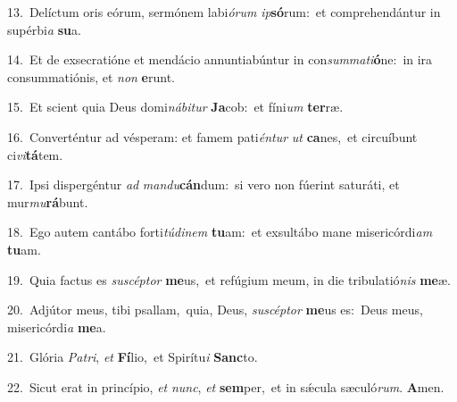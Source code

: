 {\numbfont\textcolor{\numbcolor}{13.}}~Delíctum oris eórum, sermónem labi\-\textit{ó}\-\textit{rum} \textit{ip}\-\textbf{só}rum:~\star et comprehendántur in supérbi\textit{a} \textbf{su}\-a.\par
{\numbfont\textcolor{\numbcolor}{14.}}~Et de exsecratióne et mendácio annuntiabúntur in con\-\textit{sum}\-\textit{ma}\textit{ti}\textbf{ó}ne:~\star in ira consummatiónis, et \textit{non} \textbf{e}\-runt.\par
{\numbfont\textcolor{\numbcolor}{15.}}~Et scient quia Deus domi\-\textit{ná}\-\textit{bi}\textit{tur} \textbf{Ja}\-cob:~\star et fíni\textit{um} \textbf{ter}\-ræ.\par
{\numbfont\textcolor{\numbcolor}{16.}}~Converténtur ad vésperam: et famem pati\-\textit{én}\-\textit{tur} \textit{ut} \textbf{ca}\-nes,~\star et circuíbunt ci\-\textit{vi}\-\textbf{tá}tem.\par
{\numbfont\textcolor{\numbcolor}{17.}}~Ipsi dispergéntur \textit{ad} \textit{man}\-\textit{du}\textbf{cán}dum:~\star si vero non fúerint saturáti, et mur\-\textit{mu}\-\textbf{rá}bunt.\par
{\numbfont\textcolor{\numbcolor}{18.}}~Ego autem cantábo forti\-\textit{tú}\-\textit{di}\textit{nem} \textbf{tu}\-am:~\star et exsultábo mane misericórdi\textit{am} \textbf{tu}\-am.\par
{\numbfont\textcolor{\numbcolor}{19.}}~Quia factus es \textit{su}\-\textit{scép}\textit{tor} \textbf{me}\-us,~\star et refúgium meum, in die tribulatió\textit{nis} \textbf{me}\-æ.\par
{\numbfont\textcolor{\numbcolor}{20.}}~Adjútor meus, tibi psallam,~\dagger quia, Deus, \textit{su}\-\textit{scép}\textit{tor} \textbf{me}\-us es:~\star Deus meus, misericórdi\textit{a} \textbf{me}\-a.\par
{\numbfont\textcolor{\numbcolor}{21.}}~Glória \textit{Pa}\-\textit{tri}, \textit{et} \textbf{Fí}\-lio,~\star et Spirítu\textit{i} \textbf{Sanc}\-to.\par
{\numbfont\textcolor{\numbcolor}{22.}}~Sicut erat in princípio, \textit{et} \textit{nunc}\-, \textit{et} \textbf{sem}\-per,~\star et in sǽcula sæculó\-\textit{rum}\-. \textbf{A}\-men.\par
